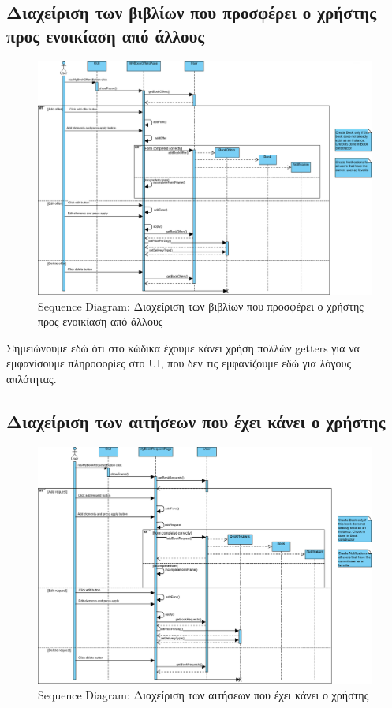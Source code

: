 \documentclass[12pt,a4paper]{article}
\begin{document}
\subsection{Διαχείριση των βιβλίων που προσφέρει ο χρήστης προς ενοικίαση από άλλους}
\begin{figure}[H]
	\includegraphics[width=\textwidth]{Manage User Book Listings Sequence.png}
	\caption{Sequence Diagram: Διαχείριση των βιβλίων που προσφέρει ο χρήστης προς ενοικίαση από άλλους}
	\label{Sequence Diagram: Διαχείριση των βιβλίων που προσφέρει ο χρήστης προς ενοικίαση από άλλους}
\end{figure}

Σημειώνουμε εδώ ότι στο κώδικα έχουμε κάνει χρήση πολλών getters για να εμφανίσουμε πληροφορίες στο UI, που δεν τις εμφανίζουμε εδώ για λόγους απλότητας.

\subsection{Διαχείριση των αιτήσεων που έχει κάνει ο χρήστης}

\begin{figure}[H]
	\includegraphics[width=\textwidth]{Manage User Requests Sequence.png}
	\caption{Sequence Diagram: Διαχείριση των αιτήσεων που έχει κάνει ο χρήστης}
	\label{Sequence Diagram: Διαχείριση των αιτήσεων που έχει κάνει ο χρήστης}
\end{figure}
\end{document}
